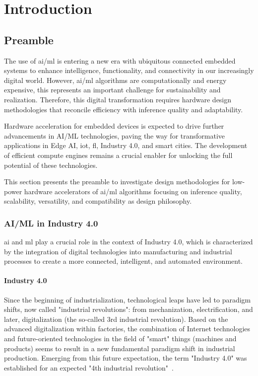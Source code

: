 \chapter{Introduction}\label{chap.intro}
\minitoc
\section{Preamble}
The use of \gls{ai}/\gls{ml} is entering a new era with ubiquitous connected embedded systems to enhance intelligence, functionality, and connectivity in our increasingly digital world. However, \gls{ai}/\gls{ml} algorithms are computationally and energy expensive, this represents an important challenge for sustainability and realization. Therefore, this digital transformation requires hardware design methodologies that reconcile efficiency with inference quality and adaptability.

Hardware acceleration for embedded devices is expected to drive further advancements in AI/ML technologies, paving the way for transformative applications in Edge AI, \gls{iot}, \gls{fl}, Industry 4.0, and smart cities. The development of efficient compute engines remains a crucial enabler for unlocking the full potential of these technologies.

This section presents the preamble to investigate design methodologies for low-power hardware accelerators of \gls{ai}/\gls{ml} algorithms focusing on inference quality, scalability, versatility, and compatibility as design philosophy.

\subsection{AI/ML in Industry 4.0}
\gls{ai} and \gls{ml} play a crucial role in the context of Industry 4.0, which is characterized by the integration of digital technologies into manufacturing and industrial processes to create a more connected, intelligent, and automated environment.

\subsubsection{Industry 4.0}
Since the beginning of industrialization, technological leaps have led to paradigm shifts, now called "industrial revolutions": from mechanization, electrification, and later, digitalization (the so-called 3rd industrial revolution). Based on the advanced digitalization within factories, the combination of Internet technologies and future-oriented technologies in the field of "smart" things (machines and products) seems to result in a new fundamental paradigm shift in industrial production. Emerging from this future expectation, the term "Industry 4.0" was established for an expected "4th industrial revolution"~\cite{lasi2014industry}.


